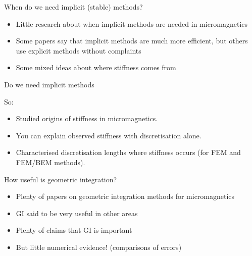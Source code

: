 \documentclass[18pt]{beamer}
\newlength{\wideitemsep}
\let\olditem\item
\renewcommand{\item}{\setlength{\itemsep}{\wideitemsep}\olditem}
\begin{document}
\begin{frame}{When do we need implicit (stable) methods?}

  \begin{itemize}
  \item Little research about when implicit methods are needed in micromagnetics
  \item Some papers say that implicit methods are much more efficient, but others use explicit methods without complaints
  \item Some mixed ideas about where stiffness comes from
  \end{itemize}

\end{frame}

\begin{frame}{Do we need implicit methods }

  So:
  \begin{itemize}
  \item Studied origins of stiffness in micromagnetics.
  \item You can explain observed stiffness with discretisation
    alone.
  \item Characterised discretisation lengths where stiffness occurs (for
    FEM and FEM/BEM methods).
  \end{itemize}

\end{frame}



\begin{frame}{How useful is geometric integration?}

  \begin{itemize}
  \item Plenty of papers on geometric integration methods for micromagnetics
  \item GI said to be very useful in other areas
  \item Plenty of claims that GI is important
  \item But little numerical evidence! (\ie comparisons of errors)
  \end{itemize}

\end{frame}
\end{document}
